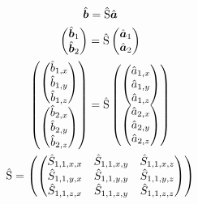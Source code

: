 \begin{equation}
    \begin{gathered}
    \hat{\bm{b}} = \hat{\mathrm{S}} \hat{\bm{a}}
    \\
    \begin{pmatrix}
        \hat{\bm{b}}_1 \\ \hat{\bm{b}}_2
    \end{pmatrix}
    =
    \hat{\mathrm{S}}
    \begin{pmatrix}
        \hat{\bm{a}}_1 \\ \hat{\bm{a}}_2
    \end{pmatrix}
    \\
    \begin{pmatrix}
        \begin{pmatrix}
            \hat{b}_{1, x} \\ \hat{b}_{1, y} \\ \hat{b}_{1, z}
        \end{pmatrix}
        \\
        \begin{pmatrix}
            \hat{b}_{2, x} \\ \hat{b}_{2, y} \\ \hat{b}_{2, z}
        \end{pmatrix}
    \end{pmatrix}
    =
    \hat{\mathrm{S}}
    \begin{pmatrix}
        \begin{pmatrix}
            \hat{a}_{1, x} \\ \hat{a}_{1, y} \\ \hat{a}_{1, z}
        \end{pmatrix}
        \\
        \begin{pmatrix}
            \hat{a}_{2, x} \\ \hat{a}_{2, y} \\ \hat{a}_{2, z}
        \end{pmatrix}
    \end{pmatrix}
    \\
    \hat{\mathrm{S}} =
    \begin{pmatrix}
        \begin{pmatrix}
            \hat{S}_{1, 1, x, x} & \hat{S}_{1, 1, x, y} & \hat{S}_{1, 1, x, z} \\
            \hat{S}_{1, 1, y, x} & \hat{S}_{1, 1, y, y} & \hat{S}_{1, 1, y, z} \\
            \hat{S}_{1, 1, z, x} & \hat{S}_{1, 1, z, y} & \hat{S}_{1, 1, z, z} \\

\end{pmatrix}
\end{pmatrix}
\end{gathered}
\end{equation}
